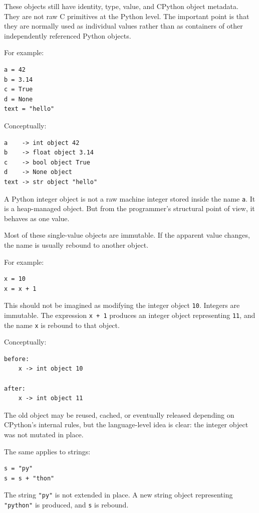 These objects still have identity, type, value, and CPython object metadata. They are not raw C primitives at the Python level. The important point is that they are normally used as individual values rather than as containers of other independently referenced Python objects.

For example:

\begin{verbatim}
a = 42
b = 3.14
c = True
d = None
text = "hello"
\end{verbatim}

Conceptually:

\begin{verbatim}
a    -> int object 42
b    -> float object 3.14
c    -> bool object True
d    -> None object
text -> str object "hello"
\end{verbatim}

A Python integer object is not a raw machine integer stored inside the name \texttt{a}. It is a heap-managed object. But from the programmer's structural point of view, it behaves as one value.

Most of these single-value objects are immutable. If the apparent value changes, the name is usually rebound to another object.

For example:

\begin{verbatim}
x = 10
x = x + 1
\end{verbatim}

This should not be imagined as modifying the integer object \texttt{10}. Integers are immutable. The expression \texttt{x + 1} produces an integer object representing \texttt{11}, and the name \texttt{x} is rebound to that object.

Conceptually:

\begin{verbatim}
before:
    x -> int object 10

after:
    x -> int object 11
\end{verbatim}

The old object may be reused, cached, or eventually released depending on CPython's internal rules, but the language-level idea is clear: the integer object was not mutated in place.

The same applies to strings:

\begin{verbatim}
s = "py"
s = s + "thon"
\end{verbatim}

The string \texttt{"py"} is not extended in place. A new string object representing \texttt{"python"} is produced, and \texttt{s} is rebound.

